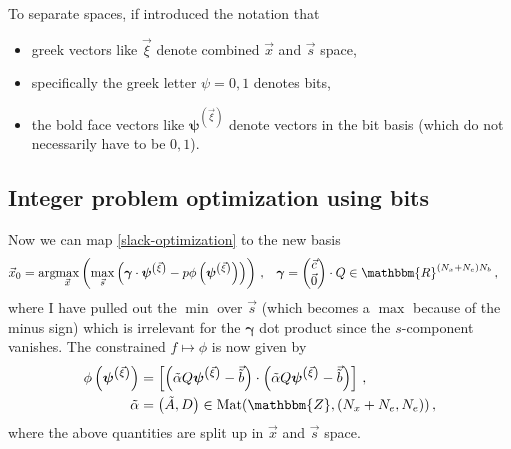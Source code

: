\documentclass[]{article}
\newcommand{\argmax}[1]{\text{arg}\hspace{-2pt}\max\limits_{#1}}
\newcommand{\bvec}[1]{\boldsymbol{#1}}
\begin{document}
To separate spaces, if introduced the notation that
\begin{itemize}
	\item greek vectors like $\vec \xi$ denote combined $\vec x$ and $\vec s$ space,
	\item specifically the greek letter $\psi = 0, 1$ denotes bits,
	\item the bold face vectors like $\bvec \psi^{\left( \vec \xi \right)}$ denote vectors in the bit basis (which do not necessarily have to be $0,1$).
\end{itemize}


\subsection{Integer problem optimization using bits}
Now we can map \eqref{slack-optimization} to the new basis
\begin{align}
	\vec x_0 
	&= \argmax{\vec x}\left(\max\limits_{\vec s}
	\left( \bvec \gamma \cdot \bvec \psi^{\left( \vec \xi \right)} - p \phi\left(\bvec \psi^{\left( \vec \xi \right)}\right)\right)\right) \, , &
	\bvec \gamma &= \begin{pmatrix}
		\vec c \\ \vec 0
	\end{pmatrix} \cdot Q \in \mathbbm{R}^{(N_x + N_e )N_b} \, , 
\end{align}
where I have pulled out the $\min$ over $\vec s$ (which becomes a $\max$ because of the minus sign) which is irrelevant for the $\bvec \gamma$ dot product since the $s$-component vanishes.
The constrained $f \mapsto \phi$ is now given by
\begin{align}\label{bit-penalty}
	\phi\left(\bvec \psi^{\left( \vec \xi \right)}\right)
	&=
	\left[
	\left(
		\tilde{\alpha} Q \bvec \psi^{\left( \vec \xi \right)} - \vec{\tilde{b}}\right) 
		\cdot \left({\tilde{\alpha}} Q \bvec \psi^{\left( \vec \xi \right)} - \vec{\tilde{b}}\right)\right]
	\, , \\
	{\tilde{\alpha}} &= \left(\tilde{A},  D \right) \in \text{Mat}(\mathbbm{Z}, (N_x + N_e, N_e))\, ,
\end{align}
where the above quantities are split up in $\vec x$ and $\vec s$ space.
\end{document}
